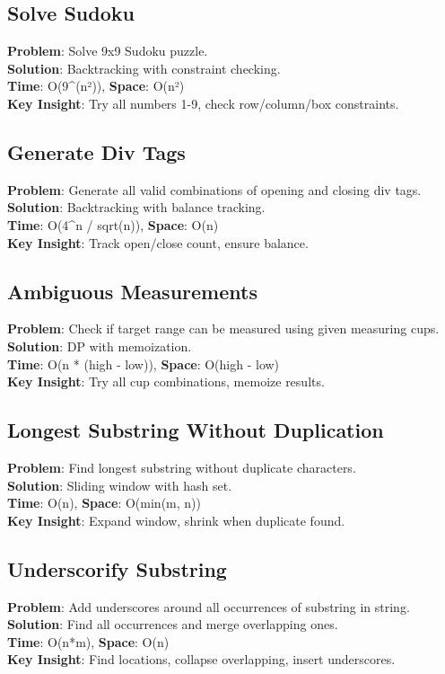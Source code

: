 \documentclass{report}
\begin{document}
\subsection{Solve Sudoku}
\textbf{Problem}: Solve 9x9 Sudoku puzzle.\\
\textbf{Solution}: Backtracking with constraint checking.\\
\textbf{Time}: O(9\textasciicircum (n²)), \textbf{Space}: O(n²)\\
\textbf{Key Insight}: Try all numbers 1-9, check row/column/box constraints.

\subsection{Generate Div Tags}
\textbf{Problem}: Generate all valid combinations of opening and closing div tags.\\
\textbf{Solution}: Backtracking with balance tracking.\\
\textbf{Time}: O(4\textasciicircum n / sqrt(n)), \textbf{Space}: O(n)\\
\textbf{Key Insight}: Track open/close count, ensure balance.

\subsection{Ambiguous Measurements}
\textbf{Problem}: Check if target range can be measured using given measuring cups.\\
\textbf{Solution}: DP with memoization.\\
\textbf{Time}: O(n * (high - low)), \textbf{Space}: O(high - low)\\
\textbf{Key Insight}: Try all cup combinations, memoize results.

\subsection{Longest Substring Without Duplication}
\textbf{Problem}: Find longest substring without duplicate characters.\\
\textbf{Solution}: Sliding window with hash set.\\
\textbf{Time}: O(n), \textbf{Space}: O(min(m, n))\\
\textbf{Key Insight}: Expand window, shrink when duplicate found.

\subsection{Underscorify Substring}
\textbf{Problem}: Add underscores around all occurrences of substring in string.\\
\textbf{Solution}: Find all occurrences and merge overlapping ones.\\
\textbf{Time}: O(n*m), \textbf{Space}: O(n)\\
\textbf{Key Insight}: Find locations, collapse overlapping, insert underscores.
\end{document}
